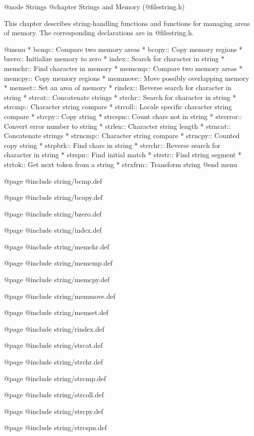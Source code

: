 @node Strings
@chapter Strings and Memory (@file{string.h})

This chapter describes string-handling functions and functions for
managing areas of memory.  The corresponding declarations are in
@file{string.h}.

@menu
* bcmp::        Compare two memory areas
* bcopy::       Copy memory regions
* bzero::       Initialize memory to zero
* index::       Search for character in string
* memchr::      Find character in memory
* memcmp::      Compare two memory areas
* memcpy::      Copy memory regions
* memmove::     Move possibly overlapping memory
* memset::      Set an area of memory
* rindex::      Reverse search for character in string
* strcat::      Concatenate strings
* strchr::      Search for character in string
* strcmp::      Character string compare
* strcoll::     Locale specific character string compare
* strcpy::      Copy string
* strcspn::     Count chars not in string
* strerror::    Convert error number to string
* strlen::      Character string length
* strncat::     Concatenate strings
* strncmp::     Character string compare
* strncpy::     Counted copy string
* strpbrk::     Find chars in string
* strrchr::     Reverse search for character in string
* strspn::      Find initial match
* strstr::      Find string segment
* strtok::      Get next token from a string
* strxfrm::     Transform string
@end menu

@page
@include string/bcmp.def

@page
@include string/bcopy.def

@page
@include string/bzero.def

@page
@include string/index.def

@page
@include string/memchr.def

@page
@include string/memcmp.def

@page
@include string/memcpy.def

@page
@include string/memmove.def

@page
@include string/memset.def

@page
@include string/rindex.def

@page
@include string/strcat.def

@page
@include string/strchr.def

@page
@include string/strcmp.def

@page
@include string/strcoll.def

@page
@include string/strcpy.def

@page
@include string/strcspn.def

